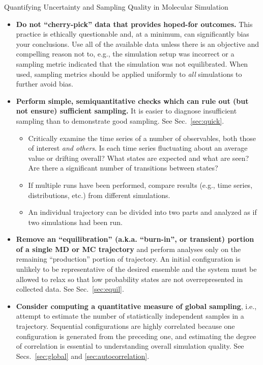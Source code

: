 \begin{Checklists*}[p!]
\begin{checklist}{Quantifying Uncertainty and Sampling Quality in Molecular Simulation}
\begin{itemize}
\item
  \textbf{Do not ``cherry-pick'' data that provides hoped-for outcomes.}
  This practice is ethically questionable and, at a minimum, can significantly bias your conclusions.
  Use all of the available data unless there is an objective and compelling reason not to, e.g., the simulation setup was incorrect or a sampling metric indicated that the simulation was not equilibrated.
  When used, sampling metrics should be applied uniformly to \emph{all} simulations to further avoid bias.
    
\item
\textbf{Perform simple, semiquantitative checks which can rule out (but not ensure) sufficient sampling.} It is easier to diagnose insufficient sampling than to demonstrate good sampling.  See Sec.\ \ref{sec:quick}.
    \begin{itemize}
    \item Critically examine the time series of a number of observables, both those of interest \emph{and others}.
      Is each time series fluctuating about an average value or drifting overall?
      What states are expected and what are seen?
      Are there a significant number of transitions between states?
    \item If multiple runs have been performed, compare results (e.g., time series, distributions, etc.) from different simulations.
    \item An individual trajectory can be divided into two parts and analyzed as if two simulations had been run.
    \end{itemize}
    \vspace{-0.325\baselineskip} %

\item
  \textbf{Remove an ``equilibration'' (a.k.a. ``burn-in'', or transient) portion of a single MD or MC trajectory} and perform analyses only on the remaining ``production'' portion of trajectory.  An initial configuration is unlikely to be representative of the desired ensemble and the system must be allowed to relax so that low probability states are not overrepresented in collected data.  See Sec.\ \ref{sec:equil}.
 
\item
  \textbf{Consider computing a quantitative measure of global sampling}, i.e., attempt to estimate the number of statistically independent samples in a trajectory.  Sequential configurations are highly correlated because one configuration is generated from the preceding one, and estimating the degree of correlation is essential to understanding overall simulation quality.
  See Secs.\ \ref{sec:global} and \ref{sec:autocorrelation}.


\end{itemize}
\end{checklist}
\end{Checklists*}
